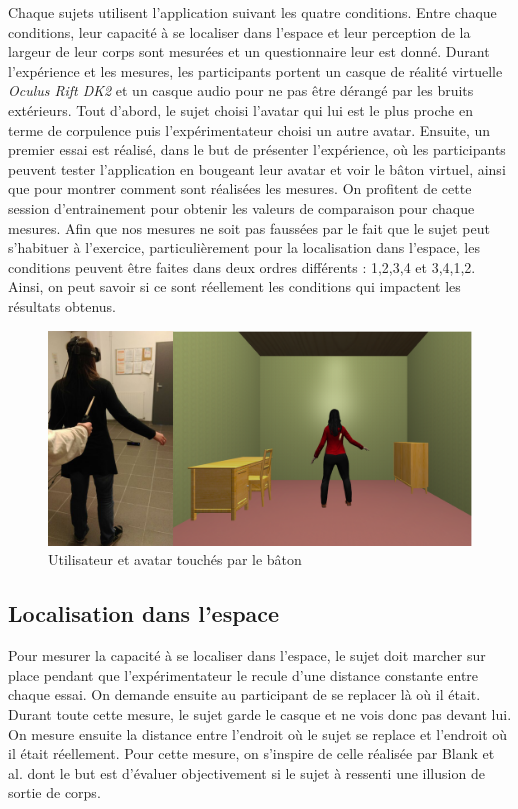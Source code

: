 Chaque sujets utilisent l'application suivant les quatre conditions. Entre chaque conditions, leur capacité à se localiser dans l'espace et leur perception de la largeur de leur corps sont mesurées et un questionnaire leur est donné. Durant l'expérience et les mesures, les participants portent un casque de réalité virtuelle \emph{Oculus Rift DK2} et un casque audio pour ne pas être dérangé par les bruits extérieurs. Tout d'abord, le sujet choisi l'avatar qui lui est le plus proche en terme de corpulence puis l'expérimentateur choisi un autre avatar. Ensuite, un premier essai est réalisé, dans le but de présenter l'expérience, où les participants peuvent tester l'application en bougeant leur avatar et voir le bâton virtuel, ainsi que pour montrer comment sont réalisées les mesures. On profitent de cette session d'entrainement pour obtenir les valeurs de comparaison pour chaque mesures. Afin que nos mesures ne soit pas faussées par le fait que le sujet peut s'habituer à l'exercice, particulièrement pour la localisation dans l'espace, les conditions peuvent être faites dans deux ordres différents : 1,2,3,4 et 3,4,1,2. Ainsi, on peut savoir si ce sont réellement les conditions qui impactent les résultats obtenus.
\begin{figure}[!h]
   	\centerline{\includegraphics[scale=0.35]{images/doubleView2}}
   	\caption{\label{batonAvatarS} Utilisateur et avatar touchés par le bâton }
\end{figure}
\subsection{Localisation dans l'espace}
Pour mesurer la capacité à se localiser dans l'espace, le sujet doit marcher sur place pendant que l'expérimentateur le recule d'une distance constante entre chaque essai. On demande ensuite au participant de se replacer là où il était. Durant toute cette mesure, le sujet garde le casque et ne vois donc pas devant lui. On mesure ensuite la distance entre l'endroit où le sujet se replace et l'endroit où il était réellement. Pour cette mesure, on s'inspire de celle réalisée par Blank et al. \cite{bl10} dont le but est d'évaluer objectivement si le sujet à ressenti une illusion de sortie de corps.
